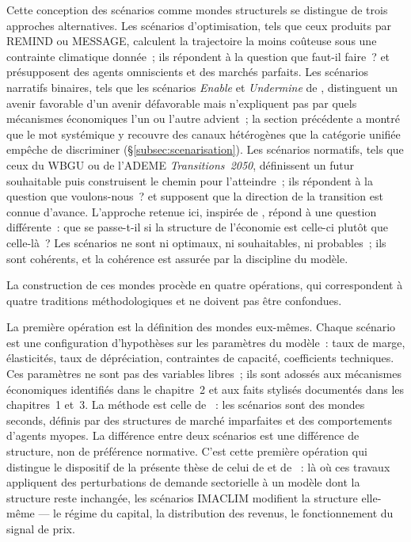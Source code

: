 Cette conception des scénarios comme mondes structurels se distingue de trois approches alternatives. Les scénarios d'optimisation, tels que ceux produits par REMIND ou MESSAGE, calculent la trajectoire la moins coûteuse sous une contrainte climatique donnée~; ils répondent à la question \og que faut-il faire~?\fg{} et présupposent des agents omniscients et des marchés parfaits. Les scénarios narratifs binaires, tels que les scénarios \emph{Enable} et \emph{Undermine} de \textcite{wilson_impacts_2026}, distinguent un avenir favorable d'un avenir défavorable mais n'expliquent pas par quels mécanismes économiques l'un ou l'autre advient~; la section précédente a montré que le mot \og systémique\fg{} y recouvre des canaux hétérogènes que la catégorie unifiée empêche de discriminer (\S\ref{subsec:scenarisation}). Les scénarios normatifs, tels que ceux du WBGU ou de l'ADEME \emph{Transitions~2050}, définissent un futur souhaitable puis construisent le chemin pour l'atteindre~; ils répondent à la question \og que voulons-nous~?\fg{} et supposent que la direction de la transition est connue d'avance. L'approche retenue ici, inspirée de \textcite{guivarch_costs_2011}, répond à une question différente~: \og que se passe-t-il si la structure de l'économie est celle-ci plutôt que celle-là~?\fg{} Les scénarios ne sont ni optimaux, ni souhaitables, ni probables~; ils sont cohérents, et la cohérence est assurée par la discipline du modèle.

La construction de ces mondes procède en quatre opérations, qui correspondent à quatre traditions méthodologiques et ne doivent pas être confondues.

La première opération est la définition des mondes eux-mêmes. Chaque scénario est une configuration d'hypothèses sur les paramètres du modèle~: taux de marge, élasticités, taux de dépréciation, contraintes de capacité, coefficients techniques. Ces paramètres ne sont pas des variables libres~; ils sont adossés aux mécanismes économiques identifiés dans le chapitre~2 et aux faits stylisés documentés dans les chapitres~1 et~3. La méthode est celle de \textcite{guivarch_costs_2011}~: les scénarios sont des mondes seconds, définis par des structures de marché imparfaites et des comportements d'agents myopes. La différence entre deux scénarios est une différence de structure, non de préférence normative. C'est cette première opération qui distingue le dispositif de la présente thèse de celui de \textcite{wilson_impacts_2026} et de \textcite{beath_impacts_2026}~: là où ces travaux appliquent des perturbations de demande sectorielle à un modèle dont la structure reste inchangée, les scénarios IMACLIM modifient la structure elle-même --- le régime du capital, la distribution des revenus, le fonctionnement du signal de prix.

